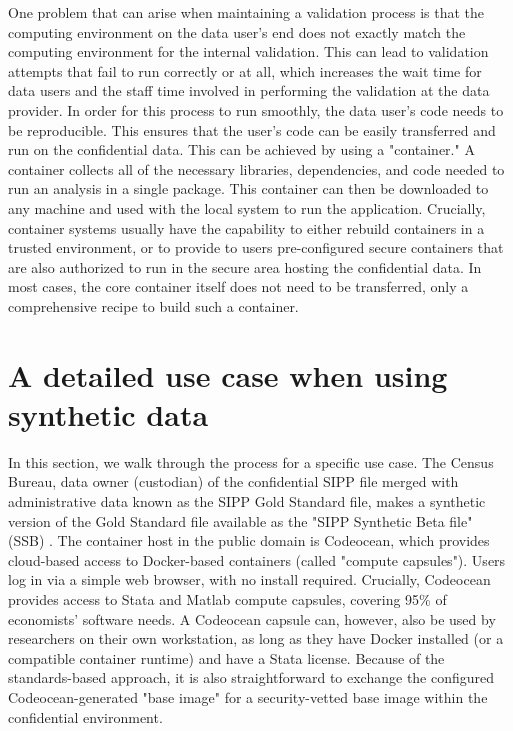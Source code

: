 \documentclass{article}
\begin{document}
One problem that can arise when maintaining a validation process is that the 
computing environment on the data user’s end does not exactly match the computing environment for
the internal validation. This can lead to validation attempts that fail to run correctly or at all, which
increases the wait time for data users and the staff time involved in performing the validation at the data provider. 
In order for this process to run smoothly, the data user's code needs to be reproducible.  This ensures that the user’s code can be easily transferred and
run on the confidential data. This can be achieved by using a "container." A container collects all of the
necessary libraries, dependencies, and code needed to run an analysis in a single
package. This container can then be downloaded to any machine and used with the local system to run
the application. Crucially, container systems usually have the capability to either rebuild containers in a trusted environment, or to provide to users pre-configured secure containers that are also authorized to run in the secure area hosting the confidential data. In most cases, the core container itself does not need to be transferred, only a comprehensive recipe to build such a container.

\section{A detailed use case when using synthetic data}
\label{sec:usecase}

In this section, we walk through the process for a specific use case. The Census Bureau, data owner (custodian) of the confidential SIPP file merged with administrative data known as the SIPP Gold Standard file, makes a synthetic version of the Gold Standard file available as the "SIPP Synthetic Beta file" (SSB) \citep{Benedettoetal_2013}. The container host in the public domain is Codeocean, which provides cloud-based access to Docker-based containers (called "compute capsules"). Users log in via a simple web browser, with no install required. Crucially, Codeocean provides access to Stata and Matlab compute capsules, covering 95\% of economists' software needs. A Codeocean capsule can, however, also be used by researchers on their own workstation, as long as they have Docker installed (or a compatible container runtime) and have a Stata license. Because of the standards-based approach, it is also straightforward to exchange the configured Codeocean-generated "base image" for a security-vetted base image within the confidential environment.
\end{document}
